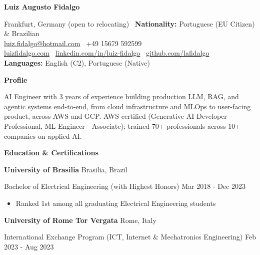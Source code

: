 \documentclass[a4paper,10pt]{article}
\begin{document}
\pagestyle{empty}
\sloppy

\begin{center}
    \Large \textbf{Luiz Augusto Fidalgo}\\
    \hrulefill
\end{center}

\begin{center}
    Frankfurt, Germany (open to relocating) \textbullet \ \textbf{Nationality:} Portuguese (EU Citizen) \& Brazilian \\
    \href{mailto:luiz.fidalgo@hotmail.com}{luiz.fidalgo@hotmail.com} \textbullet \ +49 15679 592599 \\
    \href{https://luizfidalgo.com}{luizfidalgo.com} \textbullet \ \href{https://linkedin.com/in/luiz-fidalgo}{linkedin.com/in/luiz-fidalgo} \textbullet \ \href{https://github.com/lafidalgo}{github.com/lafidalgo} \\
    \textbf{Languages:} English (C2), Portuguese (Native)
\end{center}

\begin{center}
    \textbf{Profile}
\end{center}
AI Engineer with 3 years of experience building production LLM, RAG, and agentic systems end-to-end, from cloud infrastructure and MLOps to user-facing product, across AWS and GCP. AWS certified (Generative AI Developer - Professional, ML Engineer - Associate); trained 70+ professionals across 10+ companies on applied AI.

\vspace{2pt}

\begin{center}
    \textbf{Education \& Certifications}
\end{center}
\textbf{University of Brasilia} \hfill Brasilia, Brazil

Bachelor of Electrical Engineering (with Highest Honors) \hfill Mar 2018 - Dec 2023

\begin{itemize}[noitemsep, topsep=0pt, partopsep=0pt, parsep=0pt]
    \item Ranked 1st among all graduating Electrical Engineering students
\end{itemize}

\vspace{4pt}

\textbf{University of Rome Tor Vergata} \hfill Rome, Italy

International Exchange Program (ICT, Internet \& Mechatronics Engineering) \hfill Feb 2023 - Aug 2023
\end{document}

